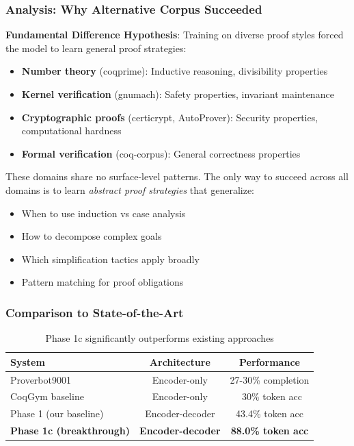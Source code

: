 \documentclass[12pt]{article}
\begin{document}
\subsubsection{Analysis: Why Alternative Corpus Succeeded}

\textbf{Fundamental Difference Hypothesis}: Training on diverse proof styles forced the model to learn general proof strategies:

\begin{itemize}
\item \textbf{Number theory} (coqprime): Inductive reasoning, divisibility properties
\item \textbf{Kernel verification} (gnumach): Safety properties, invariant maintenance
\item \textbf{Cryptographic proofs} (certicrypt, AutoProver): Security properties, computational hardness
\item \textbf{Formal verification} (coq-corpus): General correctness properties
\end{itemize}

These domains share no surface-level patterns. The only way to succeed across all domains is to learn \textit{abstract proof strategies} that generalize:
\begin{itemize}
\item When to use induction vs case analysis
\item How to decompose complex goals
\item Which simplification tactics apply broadly
\item Pattern matching for proof obligations
\end{itemize}

\subsubsection{Comparison to State-of-the-Art}

\begin{table}[h]
\centering
\begin{tabular}{lcc}
\toprule
\textbf{System} & \textbf{Architecture} & \textbf{Performance} \\
\midrule
Proverbot9001 \cite{yang2019learning} & Encoder-only & 27-30\% completion \\
CoqGym baseline & Encoder-only & ~30\% token acc \\
Phase 1 (our baseline) & Encoder-decoder & 43.4\% token acc \\
\textbf{Phase 1c (breakthrough)} & \textbf{Encoder-decoder} & \textbf{88.0\% token acc} \\
\bottomrule
\end{tabular}
\caption{Phase 1c significantly outperforms existing approaches}
\end{table}
\end{document}
